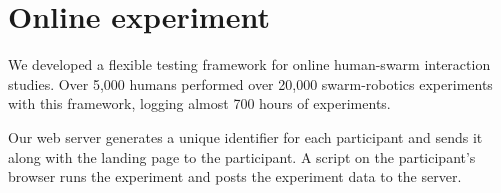 \section{Online experiment}
\label{sec:expMethods}




We developed a flexible testing framework for online human-swarm interaction studies. Over 5,000 humans performed over 20,000 swarm-robotics experiments with this framework, logging almost 700 hours of experiments.



Our web server generates a unique identifier for each participant and sends it along with the landing page to the participant. 
A script on the participant's browser runs the experiment and posts the experiment data to the server. 

